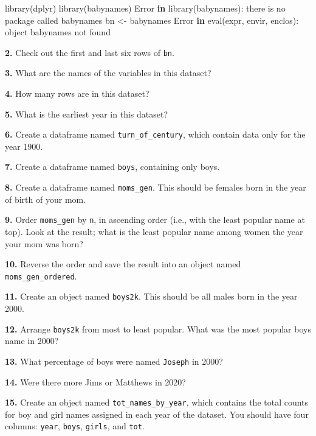 \documentclass[
]{book}
\newenvironment{Shaded}{\begin{snugshade}}{\end{snugshade}}
\newcommand{\ControlFlowTok}[1]{\textcolor[rgb]{0.13,0.29,0.53}{\textbf{#1}}}
\newcommand{\FunctionTok}[1]{\textcolor[rgb]{0.00,0.00,0.00}{#1}}
\newcommand{\NormalTok}[1]{#1}
\newcommand{\OtherTok}[1]{\textcolor[rgb]{0.56,0.35,0.01}{#1}}
\newcommand{\SpecialCharTok}[1]{\textcolor[rgb]{0.00,0.00,0.00}{#1}}
\newcommand{\StringTok}[1]{\textcolor[rgb]{0.31,0.60,0.02}{#1}}
\begin{document}
\begin{Shaded}
\begin{Highlighting}[]
\FunctionTok{library}\NormalTok{(dplyr)}
\FunctionTok{library}\NormalTok{(babynames)}
\NormalTok{Error }\ControlFlowTok{in} \FunctionTok{library}\NormalTok{(babynames)}\SpecialCharTok{:}\NormalTok{ there is no package called }\StringTok{\textquotesingle{}babynames\textquotesingle{}}
\NormalTok{bn }\OtherTok{\textless{}{-}}\NormalTok{ babynames}
\NormalTok{Error }\ControlFlowTok{in} \FunctionTok{eval}\NormalTok{(expr, envir, enclos)}\SpecialCharTok{:}\NormalTok{ object }\StringTok{\textquotesingle{}babynames\textquotesingle{}}\NormalTok{ not found}
\end{Highlighting}
\end{Shaded}

\textbf{2.} Check out the first and last six rows of \texttt{bn}.

\textbf{3.} What are the names of the variables in this dataset?

\textbf{4.} How many rows are in this dataset?

\textbf{5.} What is the earliest year in this dataset?

\textbf{6.} Create a dataframe named \texttt{turn\_of\_century}, which contain data only for the year 1900.

\textbf{7.} Create a dataframe named \texttt{boys}, containing only boys.

\textbf{8.} Create a dataframe named \texttt{moms\_gen}. This should be females born in the year of birth of your mom.

\textbf{9.} Order \texttt{moms\_gen} by \texttt{n}, in ascending order (i.e., with the least popular name at top). Look at the result; what is the least popular name among women the year your mom was born?

\textbf{10.} Reverse the order and save the result into an object named \texttt{moms\_gen\_ordered}.

\textbf{11.} Create an object named \texttt{boys2k}. This should be all males born in the year 2000.

\textbf{12.} Arrange \texttt{boys2k} from most to least popular. What was the most popular boys name in 2000?

\textbf{13.} What percentage of boys were named \texttt{Joseph} in 2000?

\textbf{14.} Were there more Jims or Matthews in 2020?

\textbf{15.} Create an object named \texttt{tot\_names\_by\_year}, which contains the total counts for boy and girl names assigned in each year of the dataset. You should have four columns: \texttt{year}, \texttt{boys}, \texttt{girls}, and \texttt{tot}.
\end{document}
